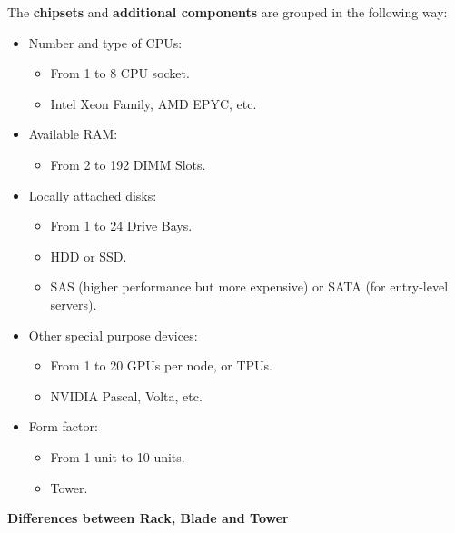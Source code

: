 \documentclass[a4paper]{article}
\newcommand{\highspace}{\vspace{1.2em}\noindent}
\begin{document}
    \highspace
    The \textbf{chipsets} and \textbf{additional components} are grouped in the following way:
    \begin{itemize}
        \item Number and type of CPUs:
        \begin{itemize}
            \item From 1 to 8 CPU socket.
            \item Intel Xeon Family, AMD EPYC, etc.
        \end{itemize}

        \item Available RAM:
        \begin{itemize}
            \item From 2 to 192 DIMM Slots.
        \end{itemize}

        \item Locally attached disks:
        \begin{itemize}
            \item From 1 to 24 Drive Bays. 
            \item HDD or SSD.
            \item SAS (higher performance but more expensive) or SATA (for entry-level servers).
        \end{itemize}

        \item Other special purpose devices:
        \begin{itemize}
            \item From 1 to 20 GPUs per node, or TPUs.
            \item NVIDIA Pascal, Volta, etc.
        \end{itemize}
        
        \item Form factor:
        \begin{itemize}
            \item From 1 unit to 10 units.
            \item Tower.
        \end{itemize}
    \end{itemize}

    \newpage

    \begin{center}
        \textcolor{Red2}{\textbf{Differences between Rack, Blade and Tower}}
    \end{center}
\end{document}
